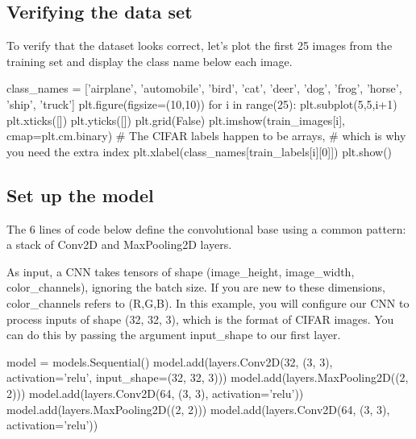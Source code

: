 \documentclass[%
oneside,                 %
final,                   %
10pt]{article}
\begin{document}
\subsection{Verifying the data set}

To verify that the dataset looks correct, let's plot the first 25 images from the training set and display the class name below each image.















\bpycod
class_names = ['airplane', 'automobile', 'bird', 'cat', 'deer',
               'dog', 'frog', 'horse', 'ship', 'truck']
plt.figure(figsize=(10,10))
for i in range(25):
    plt.subplot(5,5,i+1)
    plt.xticks([])
    plt.yticks([])
    plt.grid(False)
    plt.imshow(train_images[i], cmap=plt.cm.binary)
    # The CIFAR labels happen to be arrays, 
    # which is why you need the extra index
    plt.xlabel(class_names[train_labels[i][0]])
plt.show()

\epycod


\subsection{Set up  the model}

The 6 lines of code below define the convolutional base using a common pattern: a stack of Conv2D and MaxPooling2D layers.

As input, a CNN takes tensors of shape (image_height, image_width, color_channels), ignoring the batch size. If you are new to these dimensions, color_channels refers to (R,G,B). In this example, you will configure our CNN to process inputs of shape (32, 32, 3), which is the format of CIFAR images. You can do this by passing the argument input_shape to our first layer.












\bpycod
model = models.Sequential()
model.add(layers.Conv2D(32, (3, 3), activation='relu', input_shape=(32, 32, 3)))
model.add(layers.MaxPooling2D((2, 2)))
model.add(layers.Conv2D(64, (3, 3), activation='relu'))
model.add(layers.MaxPooling2D((2, 2)))
model.add(layers.Conv2D(64, (3, 3), activation='relu'))
\end{document}
